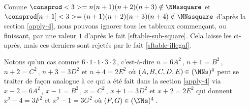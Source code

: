 \vspace{-1.5ex}
Comme
$\consprod<3> = n(n+1)(n+2)(n+3) \notin \NNssquare$
et
$\consprod[n+1]<3> = (n+1)(n+2)(n+3)(n+4) \notin \NNssquare$
d'après la section \ref{apply-4},
nous pouvons ignorer tous les tableaux commençant, ou finissant, par une valeur $1$ d'après le fait \ref{sftable-sub-square}. Cela laisse les \sftab[x] ci-après, mais ces derniers sont rejetés par le fait \ref{sftable-illegal}.

\begin{center}
\end{center}


\begin{remark}
	Notons qu'un cas comme
	$6 \cdot 1 \cdot 1 \cdot 3 \cdot 2$\,,
	c'est-à-dire
	$n = 6 A^2$\,, $n + 1 = B^2$\,, $n + 2 = C^2$\,, $n + 3 = 3 D^2$ et $n + 4 = 2 E^2$
	où $(A, B, C, D, E) \in ( \NNs )^4$
	peut se traiter de façon analogue à ce qui a été fait dans la section \ref{apply-4} via
	$x - 2 = 6 A^2$\,, $x - 1 = B^2$\,, $x = C^2$\,, $x + 1 = 3 D^2$ et $x + 2 = 2 E^2$
	qui donnent
	$x^2 - 4 = 3 F^2$ et $x^2 - 1 = 3 G^2$
	où $(F, G) \in ( \NNs )^4$\,.
\end{remark}
